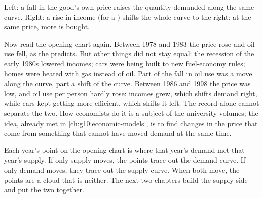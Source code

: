 \begin{omfigure}

{\small Left: a fall in the good's own price raises the quantity demanded along the same curve. Right: a rise in income
(for a ) shifts the whole curve to the right: at the same price, more is bought.}
\end{omfigure}

Now read the opening chart again. Between 1978 and 1983 the price rose and oil use fell, as the  predicts. But
other things did not stay equal: the recession of the early 1980s lowered incomes; cars were being built to new
fuel-economy rules; homes were heated with gas instead of oil. Part of the fall in oil use was a move along the curve, part
a shift of the curve. Between 1986 and 1998 the price was low, and oil use per person hardly rose: incomes grew, which
shifts demand right, while cars kept getting more efficient, which shifts it left. The record alone cannot separate the
two. How economists do it is a subject of the university volumes; the idea, already met in \cref{ch:g10:economic-models}, is
to find changes in the price that come from something that cannot have moved demand at the same time.

\begin{remark}\label{rem:g10:demand:identification}
Each year's point on the opening chart is where that year's demand met that year's supply. If only supply moves, the points
trace out the demand curve. If only demand moves, they trace out the supply curve. When both move, the points are a cloud
that is neither. The next two chapters build the supply side and put the two together.
\end{remark}

